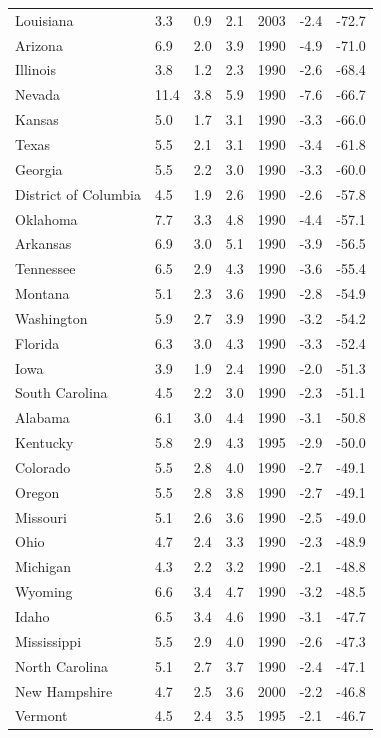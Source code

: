 \begin{longtable}{lllllll}
Louisiana & 3.3 & 0.9 & 2.1 & 2003 & -2.4 & -72.7 \\
Arizona & 6.9 & 2.0 & 3.9 & 1990 & -4.9 & -71.0 \\
Illinois & 3.8 & 1.2 & 2.3 & 1990 & -2.6 & -68.4 \\
Nevada & 11.4 & 3.8 & 5.9 & 1990 & -7.6 & -66.7 \\
Kansas & 5.0 & 1.7 & 3.1 & 1990 & -3.3 & -66.0 \\
Texas & 5.5 & 2.1 & 3.1 & 1990 & -3.4 & -61.8 \\
Georgia & 5.5 & 2.2 & 3.0 & 1990 & -3.3 & -60.0 \\
District of Columbia & 4.5 & 1.9 & 2.6 & 1990 & -2.6 & -57.8 \\
Oklahoma & 7.7 & 3.3 & 4.8 & 1990 & -4.4 & -57.1 \\
Arkansas & 6.9 & 3.0 & 5.1 & 1990 & -3.9 & -56.5 \\
Tennessee & 6.5 & 2.9 & 4.3 & 1990 & -3.6 & -55.4 \\
Montana & 5.1 & 2.3 & 3.6 & 1990 & -2.8 & -54.9 \\
Washington & 5.9 & 2.7 & 3.9 & 1990 & -3.2 & -54.2 \\
Florida & 6.3 & 3.0 & 4.3 & 1990 & -3.3 & -52.4 \\
Iowa & 3.9 & 1.9 & 2.4 & 1990 & -2.0 & -51.3 \\
South Carolina & 4.5 & 2.2 & 3.0 & 1990 & -2.3 & -51.1 \\
Alabama & 6.1 & 3.0 & 4.4 & 1990 & -3.1 & -50.8 \\
Kentucky & 5.8 & 2.9 & 4.3 & 1995 & -2.9 & -50.0 \\
Colorado & 5.5 & 2.8 & 4.0 & 1990 & -2.7 & -49.1 \\
Oregon & 5.5 & 2.8 & 3.8 & 1990 & -2.7 & -49.1 \\
Missouri & 5.1 & 2.6 & 3.6 & 1990 & -2.5 & -49.0 \\
Ohio & 4.7 & 2.4 & 3.3 & 1990 & -2.3 & -48.9 \\
Michigan & 4.3 & 2.2 & 3.2 & 1990 & -2.1 & -48.8 \\
Wyoming & 6.6 & 3.4 & 4.7 & 1990 & -3.2 & -48.5 \\
Idaho & 6.5 & 3.4 & 4.6 & 1990 & -3.1 & -47.7 \\
Mississippi & 5.5 & 2.9 & 4.0 & 1990 & -2.6 & -47.3 \\
North Carolina & 5.1 & 2.7 & 3.7 & 1990 & -2.4 & -47.1 \\
New Hampshire & 4.7 & 2.5 & 3.6 & 2000 & -2.2 & -46.8 \\
Vermont & 4.5 & 2.4 & 3.5 & 1995 & -2.1 & -46.7 \\

\end{longtable}
